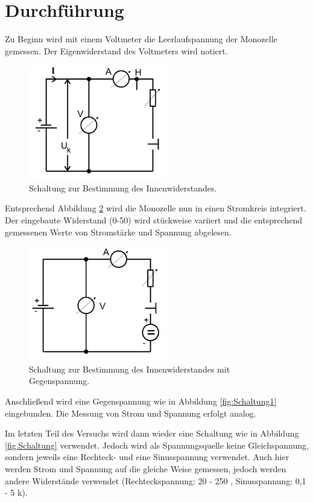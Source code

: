 \section{Durchführung}
\label{sec:Durchführung}
Zu Beginn wird mit einem Voltmeter die Leerlaufspannung der Monozelle gemessen.
Der Eigenwiderstand des Voltmeters wird notiert.

\begin{figure}[H]
  \centering
  \includegraphics[height=5cm]{Schaltung.PNG}
  \caption{Schaltung zur Bestimmung des Innenwiderstandes.}
  \label{fig:Schaltung}
\end{figure}

Entsprechend Abbildung \ref{fig:Schaltung} wird die Monozelle nun in einen
Stromkreis integriert. Der eingebaute Widerstand (0-50\Omega) wird stückweise variiert und
die entsprechend gemessenen Werte von Stromstärke und Spannung abgelesen.

\begin{figure}[H]
  \centering
  \includegraphics[height=5cm]{Schaltung1.PNG}
  \caption{Schaltung zur Bestimmung des Innenwiderstandes mit Gegenspannung.}
  \label{fig:Schaltung}
\end{figure}

Anschließend wird eine Gegenspannung wie in Abbildung \ref{fig:Schaltung1}
eingebunden. Die Messung von Strom und Spannung erfolgt analog.

Im letzten Teil des Versuchs wird dann wieder eine Schaltung wie in Abbildung
\ref{fig.Schaltung} verwendet. Jedoch wird als Spannungsquelle keine Gleichspannung,
sondern jeweils eine Rechteck- und eine Sinusspannung verwendet. Auch hier werden
Strom und Spannung auf die gleiche Weise gemessen, jedoch werden andere Widerstände
verwendet (Rechteckspannung: 20 - 250 \Omega, Sinusspannung: 0,1 - 5 k\Omega).
